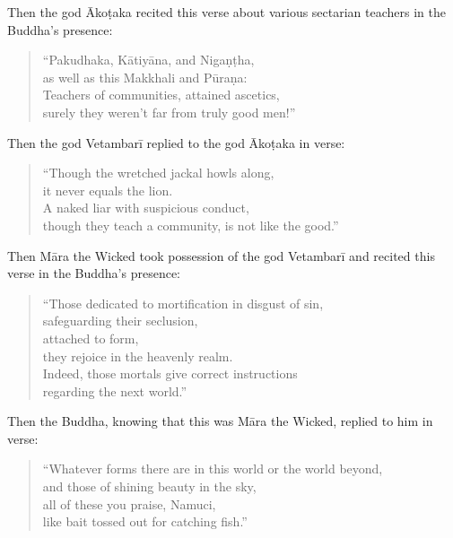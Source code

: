 \documentclass[12pt,openany]{book}%
\begin{document}
Then the god \textsanskrit{Ākoṭaka} recited this verse about various sectarian teachers in the Buddha’s presence: 

\begin{verse}%
“Pakudhaka, \textsanskrit{Kātiyāna}, and \textsanskrit{Nigaṇṭha}, \\
as well as this Makkhali and \textsanskrit{Pūraṇa}: \\
Teachers of communities, attained ascetics, \\
surely they weren’t far from truly good men!” 

%
\end{verse}

Then the god \textsanskrit{Vetambarī} replied to the god \textsanskrit{Ākoṭaka} in verse: 

\begin{verse}%
“Though the wretched jackal howls along, \\
it never equals the lion. \\
A naked liar with suspicious conduct, \\
though they teach a community, is not like the good.” 

%
\end{verse}

Then \textsanskrit{Māra} the Wicked took possession of the god \textsanskrit{Vetambarī} and recited this verse in the Buddha’s presence: 

\begin{verse}%
“Those dedicated to mortification in disgust of sin, \\
safeguarding their seclusion, \\
attached to form, \\
they rejoice in the heavenly realm. \\
Indeed, those mortals give correct instructions \\
regarding the next world.” 

%
\end{verse}

Then the Buddha, knowing that this was \textsanskrit{Māra} the Wicked, replied to him in verse: 

\begin{verse}%
“Whatever forms there are in this world or the world beyond, \\
and those of shining beauty in the sky, \\
all of these you praise, Namuci, \\
like bait tossed out for catching fish.” 

%
\end{verse}
\end{document}
